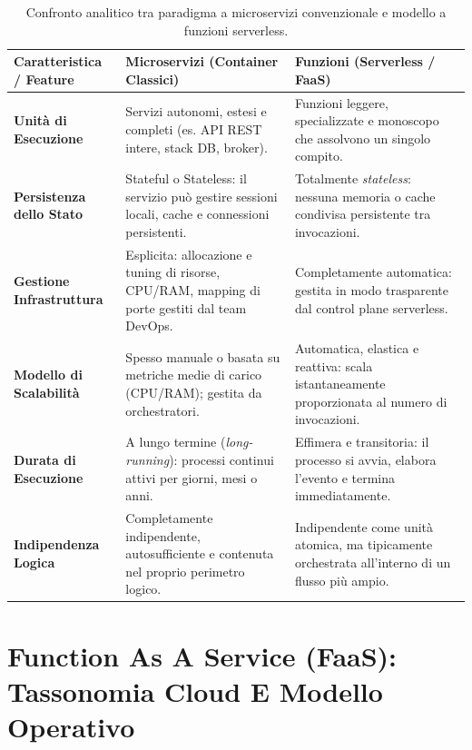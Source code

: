 \documentclass[11pt, a4paper]{article}
\begin{document}
\begin{table}[H]
\centering
\small
\renewcommand{\arraystretch}{1.3}
\begin{tabularx}{\textwidth}{p{3.2cm} X X}
\toprule
\textbf{Caratteristica / Feature} & \textbf{Microservizi (Container Classici)} & \textbf{Funzioni (Serverless / FaaS)} \\
\midrule
\textbf{Unità di Esecuzione} & Servizi autonomi, estesi e completi (es. API REST intere, stack DB, broker). & Funzioni leggere, specializzate e monoscopo che assolvono un singolo compito. \\
\textbf{Persistenza dello Stato} & Stateful o Stateless: il servizio può gestire sessioni locali, cache e connessioni persistenti. & Totalmente \emph{stateless}: nessuna memoria o cache condivisa persistente tra invocazioni. \\
\textbf{Gestione Infrastruttura} & Esplicita: allocazione e tuning di risorse, CPU/RAM, mapping di porte gestiti dal team DevOps. & Completamente automatica: gestita in modo trasparente dal control plane serverless. \\
\textbf{Modello di Scalabilità} & Spesso manuale o basata su metriche medie di carico (CPU/RAM); gestita da orchestratori. & Automatica, elastica e reattiva: scala istantaneamente proporzionata al numero di invocazioni. \\
\textbf{Durata di Esecuzione} & A lungo termine (\emph{long-running}): processi continui attivi per giorni, mesi o anni. & Effimera e transitoria: il processo si avvia, elabora l'evento e termina immediatamente. \\
\textbf{Indipendenza Logica} & Completamente indipendente, autosufficiente e contenuta nel proprio perimetro logico. & Indipendente come unità atomica, ma tipicamente orchestrata all'interno di un flusso più ampio. \\
\bottomrule
\end{tabularx}
\caption{Confronto analitico tra paradigma a microservizi convenzionale e modello a funzioni serverless.}
\label{tab:microservizi_vs_faas}
\end{table}

\newpage


\section{Function As A Service (FaaS): Tassonomia Cloud E Modello Operativo}
\end{document}
